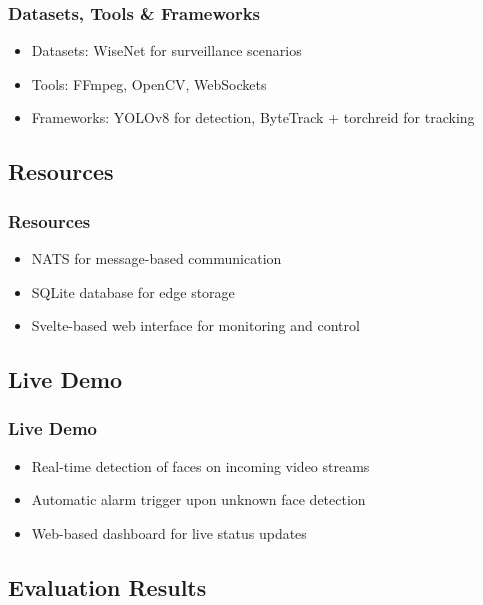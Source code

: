 \documentclass[11pt,t,usepdftitle=false,aspectratio=169]{beamer}
\begin{document}
\begin{frame}
\frametitle{Datasets, Tools \& Frameworks}
\begin{itemize}
	\item Datasets: WiseNet for surveillance scenarios
	\item Tools: FFmpeg, OpenCV, WebSockets
	\item Frameworks: YOLOv8 for detection, ByteTrack + torchreid for tracking
\end{itemize}
\end{frame}

\subsection{Resources}

\begin{frame}
\frametitle{Resources}
\begin{itemize}
	\item NATS for message-based communication
	\item SQLite database for edge storage
	\item Svelte-based web interface for monitoring and control
\end{itemize}
\end{frame}

\subsection{Live Demo}

\begin{frame}
\frametitle{Live Demo}
\begin{itemize}
	\item Real-time detection of faces on incoming video streams
	\item Automatic alarm trigger upon unknown face detection
	\item Web-based dashboard for live status updates
\end{itemize}
\end{frame}

\subsection{Evaluation Results}
\end{document}
